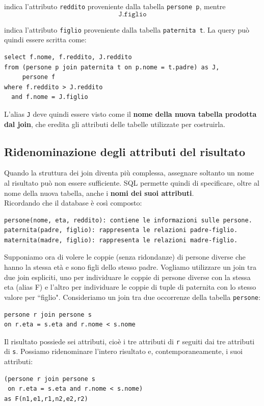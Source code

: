 \noindent indica l'attributo \texttt{reddito} proveniente dalla tabella \texttt{persone p}, mentre
\[
\texttt{J.figlio}
\]

\noindent indica l'attributo \texttt{figlio} proveniente dalla tabella \texttt{paternita t}. La query può quindi essere scritta come:
\begin{verbatim}
select f.nome, f.reddito, J.reddito
from (persone p join paternita t on p.nome = t.padre) as J,
     persone f
where f.reddito > J.reddito
  and f.nome = J.figlio
\end{verbatim}
\noindent L'alias \texttt{J} deve quindi essere visto come il \textbf{nome della nuova tabella prodotta dal join}, che eredita gli attributi delle tabelle utilizzate
per costruirla.

\subsection{Ridenominazione degli attributi del risultato}
Quando la struttura dei join diventa più complessa, assegnare soltanto un nome
al risultato può non essere sufficiente. SQL permette quindi di specificare,
oltre al nome della nuova tabella, anche i \textbf{nomi dei suoi attributi}.\medskip\\
Ricordando che il database è così composto:
\begin{verbatim}
persone(nome, eta, reddito): contiene le informazioni sulle persone.
paternita(padre, figlio): rappresenta le relazioni padre-figlio.
maternita(madre, figlio): rappresenta le relazioni madre-figlio.
\end{verbatim}
\noindent Supponiamo ora di volere le coppie (senza ridondanze) di persone diverse
che hanno la stessa età e sono figli dello stesso padre.
Vogliamo utilizzare un join tra due join espliciti, uno per individuare le coppie
di persone diverse con la stessa eta (alias F) e l’altro per individuare le
coppie di tuple di paternita con lo stesso valore per “figlio".
Consideriamo un join tra due occorrenze della tabella \texttt{persone}:
\begin{verbatim}
persone r join persone s
on r.eta = s.eta and r.nome < s.nome
\end{verbatim}

\noindent Il risultato possiede sei attributi, cioè i tre attributi di \texttt{r} seguiti
dai tre attributi di \texttt{s}. Possiamo ridenominare l'intero risultato e,
contemporaneamente, i suoi attributi:
\begin{verbatim}
(persone r join persone s
 on r.eta = s.eta and r.nome < s.nome)
as F(n1,e1,r1,n2,e2,r2)
\end{verbatim}

